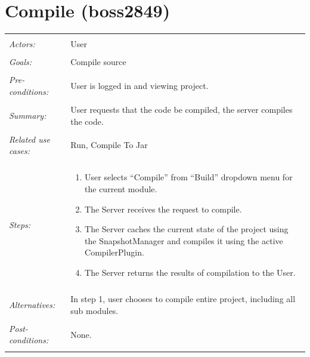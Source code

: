 \documentclass[11pt]{report}
\begin{document}
\section{Compile (boss2849)}
\begin{tabular}{ p{2cm} p{12cm} }
 \hline
 \\
 \textit{Actors:} & User \\ 
 \\
 \textit{Goals:} & Compile source \\
 \\
 \textit{Pre-conditions:} & User is logged in and viewing project. \\
 \\
 \textit{Summary:} & User requests that the code be compiled, the server compiles the code. \\
 \\
 \textit{Related use cases:} & Run, Compile To Jar \\ 
 \\
 \textit{Steps:} & \begin{enumerate}
   \item User selects ``Compile'' from ``Build'' dropdown menu for the current module.
   \item The Server receives the request to compile.
   \item The Server caches the current state of the project using the SnapshotManager and compiles it using the active CompilerPlugin.
   \item The Server returns the results of compilation to the User.
 \end{enumerate} \\
 \\
 \textit{Alternatives:} & In step 1, user chooses to compile entire project, including all sub modules. \\
 \\
 \textit{Post-conditions:} & None. \\
 \\
\hline
\end{tabular}
\end{document}
